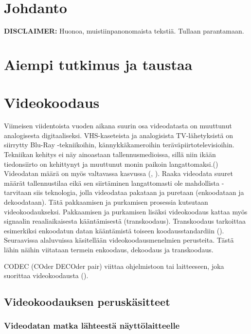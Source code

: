 
\section{Johdanto}

\textbf{DISCLAIMER:} Huonoa, muistiinpanonomaista tekstiä. Tullaan parantamaan.

\newpage

\section{Aiempi tutkimus ja taustaa}

\newpage

\section{Videokoodaus}

Viimeisen viidentoista vuoden aikana suurin osa videodatasta on muuttunut
analogisesta digitaaliseksi. VHS-kaseteista ja analogisista TV-lähetyksistä
on siirrytty Blu-Ray -tekniikoihin, kännykkäkameroihin
teräväpiirtotelevisioihin. Tekniikan kehitys ei näy ainoastaan tallennusmedioissa,
sillä niin ikään tiedonsiirto on kehittynyt ja muuttunut monin paikoin
langattomaksi.(\cite{h264})
Videodatan määrä on myös valtavassa kasvussa (\cite{cisco}, \cite{youtube}).
Raaka videodata suuret määrät tallennustilaa eikä sen siirtäminen
langattomasti ole mahdollista - tarvitaan siis teknologia, jolla videodataa pakataan ja puretaan
(enkoodataan ja dekoodataan). Tätä pakkaamisen ja purkamisen prosessia
kutsutaan videokoodaukseksi. Pakkaamisen ja purkamisen lisäksi videokoodaus kattaa
myös signaalin reaaliaikaisesta kääntämisestä (transkoodaus). Transkoodaus
tarkoittaa esimerkiksi enkoodatun datan kääntämistä toiseen koodausstandardiin (\cite{mpeg_app}).
Seuraavissa alaluvuissa käsitellään videokoodausmenelmien perusteita. Tästä lähin näihin viitataan termein
enkoodaus, dekoodaus ja transkoodaus.

CODEC (COder DECOder pair) viittaa ohjelmistoon tai laitteeseen, joka suorittaa
videokoodausta (\cite{h264}).


\subsection{Videokoodauksen peruskäsitteet}

\subsubsection{Videodatan matka lähteestä näyttölaitteelle}

